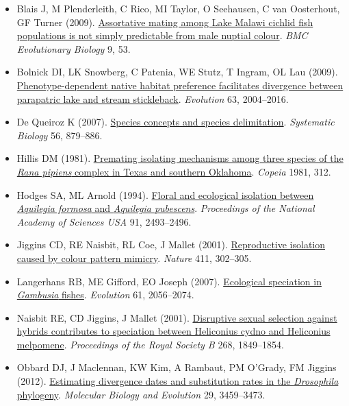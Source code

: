\documentclass[
]{book}
\begin{document}
\begin{itemize}
\item
  Blais J, M Plenderleith, C Rico, MI Taylor, O Seehausen, C van Oosterhout, GF Turner (2009). \href{https://bmcecolevol.biomedcentral.com/articles/10.1186/1471-2148-9-53}{Assortative mating among Lake Malawi cichlid fish populations is not simply predictable from male nuptial colour}. \emph{BMC Evolutionary Biology} 9, 53.
\item
  Bolnick DI, LK Snowberg, C Patenia, WE Stutz, T Ingram, OL Lau (2009). \href{https://onlinelibrary.wiley.com/doi/10.1111/j.1558-5646.2009.00699.x}{Phenotype-dependent native habitat preference facilitates divergence between parapatric lake and stream stickleback}. \emph{Evolution} 63, 2004--2016.
\item
  De Queiroz K (2007). \href{https://academic.oup.com/sysbio/article/56/6/879/1653163}{Species concepts and species delimitation}. \emph{Systematic Biology} 56, 879--886.
\item
  Hillis DM (1981). \href{https://www.jstor.org/stable/1444220?origin=crossref\&seq=1\#metadata_info_tab_contents}{Premating isolating mechanisms among three species of the \emph{Rana pipiens} complex in Texas and southern Oklahoma}. \emph{Copeia} 1981, 312.
\item
  Hodges SA, ML Arnold (1994). \href{https://www.pnas.org/content/91/7/2493}{Floral and ecological isolation between \emph{Aquilegia formosa} and \emph{Aquilegia pubescens}}. \emph{Proceedings of the National Academy of Sciences USA} 91, 2493--2496.
\item
  Jiggins CD, RE Naisbit, RL Coe, J Mallet (2001). \href{https://www.nature.com/articles/35077075}{Reproductive isolation caused by colour pattern mimicry}. \emph{Nature} 411, 302--305.
\item
  Langerhans RB, ME Gifford, EO Joseph (2007). \href{https://onlinelibrary.wiley.com/doi/10.1111/j.1558-5646.2007.00171.x}{Ecological speciation in \emph{Gambusia} fishes}. \emph{Evolution} 61, 2056--2074.
\item
  Naisbit RE, CD Jiggins, J Mallet (2001). \href{https://royalsocietypublishing.org/doi/10.1098/rspb.2001.1753}{Disruptive sexual selection against hybrids contributes to speciation between Heliconius cydno and Heliconius melpomene}. \emph{Proceedings of the Royal Society B} 268, 1849--1854.
\item
  Obbard DJ, J Maclennan, KW Kim, A Rambaut, PM O'Grady, FM Jiggins (2012). \href{https://academic.oup.com/mbe/article/29/11/3459/1150622}{Estimating divergence dates and substitution rates in the \emph{Drosophila} phylogeny}. \emph{Molecular Biology and Evolution} 29, 3459--3473.

\end{itemize}
\end{document}
